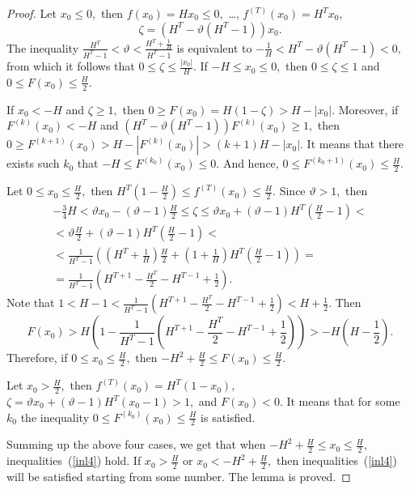 \documentclass[12pt,a4paper]{amsart}
\begin{document}
\begin{proof}
Let $x_0\leq 0,$ then $f(x_0)=Hx_0\leq 0,$ \ldots, $f^{(T)}(x_0)=H^T x_0,$
$$
\zeta=\left(H^T - \vartheta (H^T - 1)\right)x_0.
$$
The inequality $\frac{H^T}{H^T-1}<\vartheta<\frac{H^T+\frac{1}{H}}{H^T-1}$ is equivalent to 
$-\frac{1}{H}<H^T-\vartheta(H^T-1)<0,$ from which it follows that $0\leq\zeta\leq\frac{|x_0|}{H}.$ If $-H\leq x_0\leq 0,$ then 
$0\leq\zeta\leq 1$ and $0\leq F(x_0)\leq \frac{H}{2}.$

If $x_0<-H$ and $\zeta\geq 1,$ then $0\geq F(x_0)=H(1-\zeta)>H-|x_0|.$ Moreover, if $F^{(k)}(x_0)<-H$ and 
$\left(H^T - \vartheta (H^T - 1)\right)F^{(k)}(x_0)\geq 1,$ then $0\geq F^{(k+1)}(x_0)>H-\left|F^{(k)}(x_0)\right|>(k+1)H-|x_0|.$
It means that there exists such $k_0$ that $-H\leq F^{(k_0)}(x_0)\leq 0.$ And hence, $0\leq F^{(k_0+1)}(x_0)\leq\frac{H}{2}.$

Let $0\leq x_0\leq \frac{H}{2},$ then $H^T \left(1-\frac{H}{2}\right)\leq f^{(T)}(x_0)\leq\frac{H}{2}.$ Since $\vartheta>1,$ then
\begin{gather*}
-\frac34 H < \vartheta x_0 - (\vartheta-1)\frac{H}{2} \leq \zeta \leq \vartheta x_0 + (\vartheta-1)H^T\left(\frac{H}{2}-1\right) < \\
< \vartheta\frac{H}{2} + (\vartheta-1)H^T\left(\frac{H}{2}-1\right) <\\
<\frac{1}{H^T-1}\left( \left( H^T+\frac{1}{H} \right)\frac{H}{2} + \left( 1+\frac{1}{H} \right) H^T \left( \frac{H}{2}-1 \right) \right) = \\
=\frac{1}{H^T-1} \left( H^{T+1} - \frac{H^T}{2} - H^{T-1} + \frac12\right).
\end{gather*}
Note that $1<H-1<\frac{1}{H^T-1} \left( H^{T+1} - \frac{H^T}{2} - H^{T-1} + \frac12\right)<H+\frac12.$ Then 
$$
F(x_0) > H\left(1 - \frac{1}{H^T-1} \left( H^{T+1} - \frac{H^T}{2} - H^{T-1} + \frac12\right) \right) > -H\left(H - \frac12\right).
$$
Therefore, if $0\leq x_0\leq \frac{H}{2},$ then $-H^2+\frac{H}{2}\leq F(x_0) \leq \frac{H}{2}.$

Let $x_0 > \frac{H}{2},$ then $f^{(T)}(x_0)=H^T (1-x_0),$  $\zeta=\vartheta x_0 + (\vartheta - 1) H^T (x_0 - 1) > 1,$ and $F(x_0)<0.$
It means that for some $k_0$ the inequality $0 \leq F^{(k_0)}(x_0) \leq \frac{H}{2}$ is satisfied.  

Summing up the above four cases, we get that when $-H^2+\frac{H}{2}\leq x_0 \leq \frac{H}{2},$ inequalities~(\ref{inl4}) hold. 
If $x_0>\frac{H}{2}$ or $x_0<-H^2+\frac{H}{2},$ then inequalities~(\ref{inl4}) will be satisfied starting from some number. 
The lemma is proved. 
\end{proof}
\end{document}

